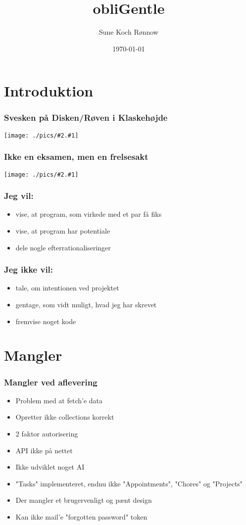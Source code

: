 \documentclass[xcolor={dvipsnames}]{beamer}
\title[Svendeprøve]{obliGentle}
\author{Sune Koch Rønnow}
\institute{Aarhus Tech}
\date{\today}
\newcommand{\pic}[2][png]{
	\begin{center}
	\texttt{[image: ./pics/\#2.\#1]}\\
	\end{center}
}
\begin{document}

\section{Introduktion}

\begin{frame}
\titlepage
\end{frame}

\begin{frame}
\tableofcontents
\end{frame}

\begin{frame}
\frametitle{Svesken på Disken/Røven i Klaskehøjde}
\pic{minKode}
\end{frame}

\begin{frame}
\frametitle{Ikke en eksamen, men en frelsesakt}
\pic{buddyJesus}
\end{frame}

\begin{frame}
\frametitle{Jeg vil:}
\begin{itemize}
\item vise, at program, som virkede med et par få fiks
\item vise, at program har potentiale
\item dele nogle efterrationaliseringer
\end{itemize}
\end{frame}

\begin{frame}
\frametitle{Jeg ikke vil:}
\begin{itemize}
\item tale, om intentionen ved projektet
\item gentage, som vidt muligt, hvad jeg har skrevet
\item fremvise noget kode
\end{itemize}
\end{frame}

\section{Mangler}

\begin{frame}
\frametitle{Mangler ved aflevering}
\begin{itemize}
\item Problem med at fetch'e data
\item Opretter ikke collections korrekt
\item 2 faktor autorisering
\item API ikke på nettet
\item Ikke udviklet noget AI
\item "Tasks" implementeret, endnu ikke "Appointments", "Chores" og "Projects" 
\item Der mangler et brugervenligt og pænt design
\item Kan ikke mail'e "forgotten password" token
\end{itemize}
\end{frame}
\end{document}

